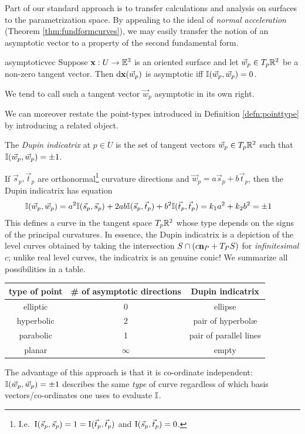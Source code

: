 \goodbreak


Part of our standard approach is to transfer calculations and analysis on surfaces to the parametrization space. By appealing to the ideal of \emph{normal acceleration} (Theorem \ref{thm:fundformcurves}), we may easily transfer the notion of an asymptotic vector to a property of the second fundamental form.

\begin{thm}{}{asymptoticvec}
Suppose ${\mathbf{x}}:U\to\mathbb{E}^3$ is an oriented surface and let $\vec w_p\in T_p\mathbb{R}^2$ be a non-zero tangent vector. Then $\mathrm{d}{\mathbf{x}}(\vec w_p)$ is asymptotic iff $\mathbb{I}(\vec w_p,\vec w_p)=0$.
\end{thm}

We tend to call such a tangent vector $\vec w_p$ asymptotic in its own right.\smallbreak

We can moreover restate the point-types introduced in Definition \ref{defn:pointtype} by introducing a related object.

\begin{defn}{}{}
The \emph{Dupin indicatrix} at $p\in U$ is the set of tangent vectors $\vec w_p\in T_p\mathbb{R}^2$ such that $\mathbb{I}(\vec w_p,\vec w_p)=\pm 1$.
\end{defn}

If $\vec s_p,\vec t_p$ are orthonormal\footnote{I.e.\ $\mathrm{I}(\vec s_p,\vec s_p)=1=\mathrm{I}(\vec t_p,\vec t_p)$ and $\mathrm{I}(\vec s_p,\vec t_p)=0$.} curvature directions and $\vec w_p=a\vec s_p+b\vec t_p$, then the Dupin indicatrix has equation
\begin{align*}
\mathbb{I}(\vec w_p,\vec w_p)&=a^2\mathbb{I}(\vec s_p,\vec s_p) +2ab\mathbb{I}(\vec s_p,\vec t_p) + b^2\mathbb{I}(\vec t_p,\vec t_p) =k_1a^2+k_2b^2=\pm 1
\end{align*}
This defines a curve in the tangent space $T_p\mathbb{R}^2$ whose type depends on the signs of the principal curvatures. In essence, the Dupin indicatrix is a depiction of the level curves obtained by taking the intersection $S\cap (c{\mathbf{n}}_P+T_PS)$ for \emph{infinitesimal} $c$; unlike real level curves, the indicatrix is an genuine conic! We summarize all possibilities in a table.
\begin{center}
\begin{tabular}{c|c|c}
type of point&\# of asymptotic directions&Dupin indicatrix\\\hline
elliptic&0&ellipse\\
hyperbolic&2&pair of hyperbolæ\\
parabolic&1&pair of parallel lines\\
planar&$\infty$&empty
\end{tabular}
\end{center}
The advantage of this approach is that it is co-ordinate independent: $\mathbb{I}(\vec w_p,\vec w_p)=\pm 1$ describes the same \emph{type} of curve regardless of which basis vectors/co-ordinates one uses to evaluate $\mathbb{I}$.


